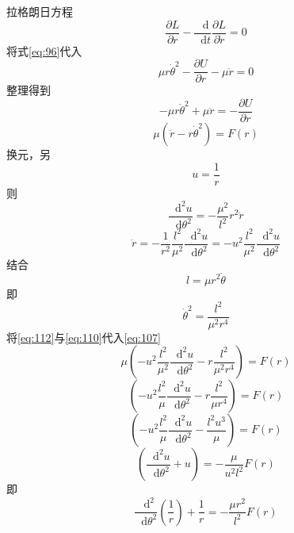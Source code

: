 \documentclass{article}
\newcommand*{\dif}{\mathop{}\!\mathrm{d}}
\begin{document}
拉格朗日方程
\begin{equation}
  \label{eq:104}
  \dfrac{\partial L}{\partial r} - \dfrac{\dif}{\dif t} \dfrac{\partial L}{\partial \dot{r}} = 0
\end{equation}
将式\ref{eq:96}代入
\begin{equation}
  \label{eq:105}
  \mu r \dot{\theta}^{2} - \dfrac{\partial U}{\partial r} - \mu \ddot{r} = 0
\end{equation}
整理得到
\begin{equation}
  \label{eq:106}
  -\mu r \dot{\theta}^{2} + \mu \ddot{r} = - \dfrac{\partial U}{\partial r}
\end{equation}
\begin{equation}
  \label{eq:107}
  \mu \left( \ddot{r} - r \dot{\theta}^{2} \right) = F(r)
\end{equation}
换元，另
\begin{equation}
  \label{eq:108}
  u = \dfrac{1}{r}
\end{equation}
则
\begin{equation}
  \label{eq:109}
  \dfrac{\dif^{2} u}{\dif \theta^{2}} = - \dfrac{\mu^{2}}{l^2} r^{2} \ddot{r}  
\end{equation}
\begin{equation}
  \label{eq:110}
  \ddot{r} = - \dfrac{1}{r^{2}} \dfrac{l^2}{\mu^{2}} \dfrac{\dif^{2} u}{\dif \theta^{2}} = - u^{2} \dfrac{l^2}{\mu^{2}} \dfrac{\dif^{2} u}{\dif \theta^{2}} 
\end{equation}
结合
\begin{equation}
  \label{eq:111}
  l = \mu r^{2} \dot{\theta}
\end{equation}
即
\begin{equation}
  \label{eq:112}
  \dot{\theta}^{2} = \dfrac{l^{2}}{\mu^{2} r^{4}} 
\end{equation}
将\ref{eq:112}与\ref{eq:110}代入\ref{eq:107}
\begin{equation}
  \label{eq:113}
  \mu \left( - u^{2} \dfrac{l^2}{\mu^{2}} \dfrac{\dif^{2} u}{\dif \theta^{2}}  - r \dfrac{l^{2}}{\mu^{2} r^{4}}  \right) = F(r)
\end{equation}
\begin{equation}
  \label{eq:114}
  \left( - u^{2} \dfrac{l^2}{\mu} \dfrac{\dif^{2} u}{\dif \theta^{2}}  - r \dfrac{l^{2}}{\mu r^{4}}  \right) = F(r)
\end{equation}
\begin{equation}
  \label{eq:115}
  \left( - u^{2} \dfrac{l^2}{\mu} \dfrac{\dif^{2} u}{\dif \theta^{2}}  - \frac{l^{2}u^{3}}{\mu}  \right) = F(r)
\end{equation}
\begin{equation}
  \label{eq:116}
    \left( \dfrac{\dif^{2} u}{\dif \theta^{2}}  + u   \right) = - \dfrac{\mu}{u^{2} l^{2}}  F(r)
\end{equation}
即
\begin{equation}
  \label{eq:117}
  \dfrac{\dif^{2}}{\dif \theta^{2}}\left( \dfrac{1}{r}     \right) + \dfrac{1}{r}  = - \dfrac{\mu r^{2}}{l^{2}}  F(r)
\end{equation}
\end{document}
